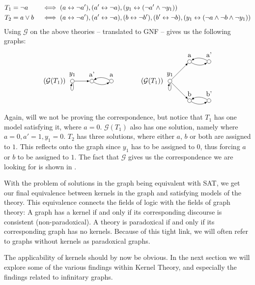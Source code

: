 \begin{example}
  \begin{align}
    T_1 &= \neg a &&\iff ( a \leftrightarrow \neg a'), (a' \leftrightarrow \neg a), (y_1 \leftrightarrow (\neg a' \wedge \neg y_1))\\
    T_2 &= a \vee b &&\iff ( a \leftrightarrow \neg a'), (a' \leftrightarrow \neg a), (b \leftrightarrow \neg b'), (b' \leftrightarrow \neg b), (y_1 \leftrightarrow (\neg a \wedge \neg b \wedge \neg y_1))
  \end{align}
  Using $\mathcal{G}$ on the above theories -- translated to GNF -- gives us the following graphs:
  \[
    \begin{tikzpicture}
      [
      point/.style={circle,draw,inner sep=0pt,minimum size=2mm},
      collection/.style={thick,rectangle,draw,inner sep=0pt,minimum height=14mm, minimum width= 9mm}
      ]
      \node (label) at (0,1) [label=left:$(\mathcal{G}(T_1))\;$] {};
      \node (0) at (0,1) [point,label=above:$y_1$] {};
      \node (1) at (1,1) [point,label=above:a'] {};
      \node (2) at (2,1) [point,label=above:a] {};
      \draw [-latex, loop below] (0) to (0);
      \draw [-latex] (0) to (1);
      \draw [-latex, bend right] (1) to (2);
      \draw [-latex, bend right] (2) to (1);

      \node (label) at (5,1) [label=left:$(\mathcal{G}(T_1))\;$] {};
      \node (0) at (5,1) [point,label=above:$y_1$] {};
      \node (1) at (6,0) [point,label=above:b] {};
      \node (2) at (7,0) [point,label=above:b'] {};
      \node (3) at (6,2) [point,label=above:a] {};
      \node (4) at (7,2) [point,label=above:a'] {};
      \draw [-latex, loop below] (0) to (0);
      \draw [-latex] (0) to (1);
      \draw [-latex, bend right] (1) to (2);
      \draw [-latex, bend right] (2) to (1);
      \draw [-latex] (0) to (3);
      \draw [-latex, bend right] (3) to (4);
      \draw [-latex, bend right] (4) to (3);
    \end{tikzpicture}
  \]
\end{example}
Again, will we not be proving the correspondence, but notice that $T_1$ has one model satisfying it, where $a = 0$.
$\mathcal{G}(T_1)$ also has one solution, namely where $a = 0, a' = 1, y_1 = 0$.
$T_2$ has three solutions, where either $a$, $b$ or both are assigned to $1$.
This reflects onto the graph since $y_1$ has to be assigned to $0$, thus forcing $a$ or $b$ to be assigned to $1$.
The fact that $\mathcal{G}$ gives us the correspondence we are looking for is shown in \cite{apal-digraph}.

With the problem of solutions in the graph being equivalent with SAT, we get our final equivalence between kernels in the graph and satisfying models of the theory.
This equivalence connects the fields of logic with the fields of graph theory:
A graph has a kernel if and only if its corresponding discourse is consistent (non-paradoxical).
A theory is paradoxical if and only if its corresponding graph has no kernels.
Because of this tight link, we will often refer to graphs without kernels as paradoxical graphs.

The applicability of kernels should by now be obvious.
In the next section we will explore some of the various findings within Kernel Theory, and especially the findings related to infinitary graphs.
